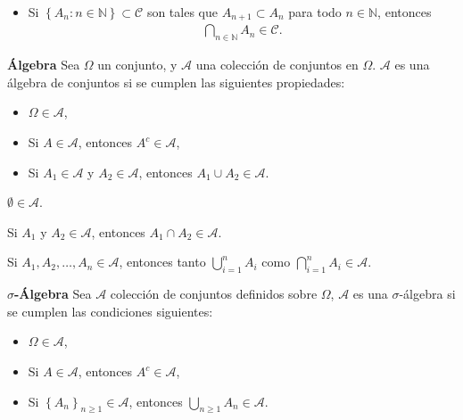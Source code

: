 \begin{Propty}
\begin{itemize}
\item[(ix)] Si $\left\{A_n : n \in \mathbb{N}\right\} \subset \mathcal{C}$ son tales que
$A_{n+1} \subset A_n$ para todo $n \in \mathbb{N}$, entonces
\begin{eqnarray*}
\bigcap_{n \in \mathbb{N}} A_n \in \mathcal{C}.
\end{eqnarray*}
\end{itemize}
\end{Propty}



\begin{Def}\textbf{\'Algebra}
Sea $\Omega$ un conjunto, y $\mathcal{A}$ una colecci\'on de conjuntos en $\Omega$. $\mathcal{A}$ es una \'algebra de conjuntos si se cumplen las siguientes propiedades:
\begin{itemize}
\item[i) ] $\Omega\in \mathcal{A}$,
\item[ii)] Si $A\in\mathcal{A}$, entonces $A^{c}\in\mathcal{A}$,
\item[iii) ] Si $A_{1}\in\mathcal{A}$ y $A_{2}\in\mathcal{A}$, entonces $A_{1}\cup A_{2}\in\mathcal{A}$.
\end{itemize}
\end{Def}

\begin{Teo}
$\emptyset\in\mathcal{A}$.
\end{Teo}

\begin{Teo}
Si $A_{1}$ y $A_{2}\in\mathcal{A}$, entonces $A_{1}\cap A_{2}\in\mathcal{A}$.
\end{Teo}

\begin{Teo}
Si $A_{1},A_{2},\dots,A_{n}\in\mathcal{A}$, entonces tanto $\bigcup_{i=1}^{n}A_{i}$ como $\bigcap_{i=1}^{n}A_{i}\in\mathcal{A}$.
\end{Teo}


\begin{Def}\textbf{$\sigma$-\'Algebra}
Sea $\mathcal{A}$ colecci\'on de conjuntos definidos sobre $\Omega$, $\mathcal{A}$ es una $\sigma$-\'algebra si se cumplen las condiciones siguientes:
\begin{itemize}
\item[i) ] $\Omega\in \mathcal{A}$,
\item[ii)] Si $A\in\mathcal{A}$, entonces $A^{c}\in\mathcal{A}$,
\item[iii) ] Si $\left\{A_{n}\right\}_{n\geq1}\in\mathcal{A}$, entonces $\bigcup_{n\geq1} A_{n}\in\mathcal{A}$.
\end{itemize}

\end{Def}

